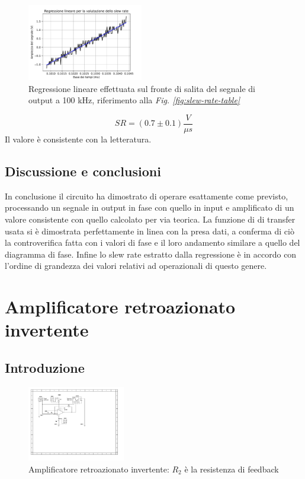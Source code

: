 \documentclass[journal]{IEEEtran}
\begin{document}
\begin{figure}[H]%
\begin {center}
\includegraphics[width=0.45\textwidth]{analysis/output/OPA-slew-rate-fit.pdf}
\caption{Regressione lineare effettuata sul fronte di salita del segnale di output a 100 kHz, riferimento alla \textit{Fig. \ref{fig:slew-rate-table}}}
\label{fig:slew-rate-fit}
\end {center}
\end{figure}
\[SR = (0.7 \pm 0.1) \frac{V}{\mu s}\]
Il valore è consistente con la letteratura.
\subsection{\textbf{Discussione e conclusioni}}
In conclusione il circuito ha dimostrato di operare esattamente come previsto, processando un segnale in output in fase con quello in input e amplificato di un valore consistente con quello calcolato per via teorica. La funzione di di transfer usata si è dimostrata perfettamente in linea con la presa dati, a conferma di ciò la controverifica fatta con i valori di fase e il loro andamento similare a quello del diagramma di fase. Infine lo slew rate estratto dalla regressione è in accordo con l'ordine di grandezza dei valori relativi ad operazionali di questo genere. 

\section{\textbf{Amplificatore retroazionato invertente}} %
\subsection{\textbf{Introduzione}}
\begin{figure}[H]%
\begin {center}
\includegraphics[width=0.38\textwidth]{sch-simulations/output/OPA-closed-loop-inverting.pdf}
\caption{Amplificatore retroazionato invertente: $R_2$ è la resistenza di feedback}
\label{fig:circ_closed_loop_inv}
\end {center}
\end{figure}
\end{document}
